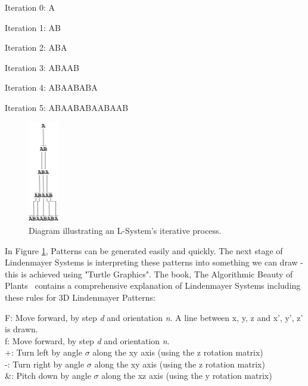 \documentclass[a4paper,10pt]{report}
\begin{document}
Iteration 0: A

Iteration 1: AB

Iteration 2: ABA

Iteration 3: ABAAB

Iteration 4: ABAABABA

Iteration 5: ABAABABAABAAB\medskip


\begin{figure}[h!]
\centering
  \includegraphics[width=0.12\textwidth]{Images/Charts/AB_Example.png}
 \caption{Diagram illustrating an L-System's iterative process.}
 \label{fig:l_system_AB}
\end{figure}


In Figure \ref{fig:l_system_AB}, Patterns can be generated easily and quickly. The next stage of Lindenmayer Systems is interpreting these patterns into something we can draw - this is achieved using "Turtle Graphics". The book, The Algorithmic Beauty of Plants~\cite{prusinkiewicz2012algorithmic} contains a comprehensive explanation of Lindenmayer Systems including these rules for 3D Lindenmayer Patterns:\medskip


\setlength{\parindent}{1cm}F: Move forward, by step \textit{d} and orientation \textit{n}. A line between {x, y, z} and {x', y', z'} is drawn. \\


\setlength{\parindent}{1cm}f: Move forward, by step \textit{d} and orientation \textit{n}. \\


\setlength{\parindent}{1cm}+: Turn left by angle $\sigma$ along the xy axis (using the z rotation matrix)\\


\setlength{\parindent}{1cm}-: Turn right by angle $\sigma$ along the xy axis (using the z rotation matrix)\\


\setlength{\parindent}{1cm}\&: Pitch down by angle $\sigma$ along the xz axis (using the y rotation matrix)\\
\end{document}
